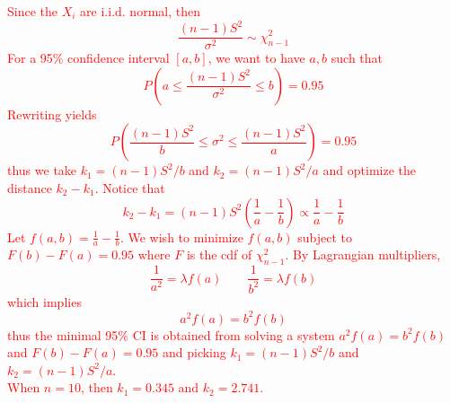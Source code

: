\documentclass[12pt]{article}
\begin{document}
\begin{enumerate}
\textcolor{red}{
Since the $X_i$ are i.i.d. normal, then 
\begin{equation*}
    \frac{(n-1)S^2}{\sigma^2} \sim \chi_{n-1}^2
\end{equation*}
For a 95\% confidence interval $[a, b]$, we want to have $a, b$ such that 
\begin{equation*}
    P\left( a \leq \frac{(n-1)S^2 }{\sigma^2} \leq b \right) = 0.95
\end{equation*}
Rewriting yields 
\begin{equation*}
    P\left(\frac{(n-1)S^2}{b} \leq \sigma^2 \leq \frac{(n-1)S^2}{a}\right) = 0.95
\end{equation*}
thus we take $k_1 = (n-1)S^2/b$ and $k_2 = (n-1)S^2 / a$ and optimize the distance $k_2 - k_1$. Notice that 
\begin{equation*}
    k_2 - k_1 = (n-1)S^2 \left(\frac1a - \frac 1b\right) \propto \frac 1a - \frac 1b
\end{equation*}
Let $f(a, b) = \frac 1a - \frac 1b$. We wish to minimize $f(a, b)$ subject to $F(b) - F(a) = 0.95$ where $F$ is the cdf of $\chi_{n-1}^2$. By Lagrangian multipliers, 
\begin{equation*}
    \frac{1}{a^2} = \lambda f(a)  \qquad \frac{1}{b^2} = \lambda f(b)
\end{equation*}
which implies 
\begin{equation*}
    a^2 f(a) = b^2f(b)
\end{equation*}
thus the minimal 95\% CI is obtained from solving a system $a^2f(a) = b^2f(b)$ and $F(b) - F(a) = 0.95$ and picking $k_1 = (n-1)S^2/b$ and $k_2 = (n-1)S^2/a$. \\
When $n = 10$, then $k_1 = 0.345$ and $k_2 = 2.741$. 
}
\end{enumerate}
\end{document}
